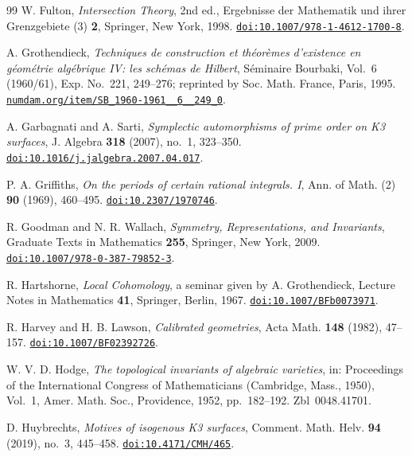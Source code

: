 \documentclass[11pt,reqno]{amsart}
\numberwithin{equation}{section}
\theoremstyle{plain}
\theoremstyle{definition}
\begin{document}
\begin{thebibliography}{99}
W. Fulton,
\emph{Intersection Theory}, 2nd ed.,
Ergebnisse der Mathematik und ihrer Grenzgebiete (3) \textbf{2},
Springer, New York, 1998.
\href{https://doi.org/10.1007/978-1-4612-1700-8}{\nolinkurl{doi:10.1007/978-1-4612-1700-8}}.

A. Grothendieck,
\emph{Techniques de construction et th\'eor\`emes d'existence en g\'eom\'etrie
alg\'ebrique IV: les sch\'emas de Hilbert},
S\'eminaire Bourbaki, Vol.~6 (1960/61), Exp. No.~221, 249--276;
reprinted by Soc. Math. France, Paris, 1995.
\href{http://www.numdam.org/item/SB_1960-1961__6__249_0/}{\nolinkurl{numdam.org/item/SB_1960-1961__6__249_0}}.

A. Garbagnati and A. Sarti,
\emph{Symplectic automorphisms of prime order on K3 surfaces},
J. Algebra \textbf{318} (2007), no.~1, 323--350.
\href{https://doi.org/10.1016/j.jalgebra.2007.04.017}{\nolinkurl{doi:10.1016/j.jalgebra.2007.04.017}}.

P. A. Griffiths,
\emph{On the periods of certain rational integrals. I},
Ann. of Math. (2) \textbf{90} (1969), 460--495.
\href{https://doi.org/10.2307/1970746}{\nolinkurl{doi:10.2307/1970746}}.

R. Goodman and N. R. Wallach,
\emph{Symmetry, Representations, and Invariants},
Graduate Texts in Mathematics \textbf{255}, Springer, New York, 2009.
\href{https://doi.org/10.1007/978-0-387-79852-3}{\nolinkurl{doi:10.1007/978-0-387-79852-3}}.

R. Hartshorne,
\emph{Local Cohomology}, a seminar given by A. Grothendieck,
Lecture Notes in Mathematics \textbf{41}, Springer, Berlin, 1967.
\href{https://doi.org/10.1007/BFb0073971}{\nolinkurl{doi:10.1007/BFb0073971}}.

R. Harvey and H. B. Lawson,
\emph{Calibrated geometries},
Acta Math. \textbf{148} (1982), 47--157.
\href{https://doi.org/10.1007/BF02392726}{\nolinkurl{doi:10.1007/BF02392726}}.

W. V. D. Hodge,
\emph{The topological invariants of algebraic varieties},
in: Proceedings of the International Congress of Mathematicians (Cambridge, Mass., 1950), Vol.~1,
Amer. Math. Soc., Providence, 1952, pp.~182--192. Zbl~0048.41701.

D. Huybrechts,
\emph{Motives of isogenous K3 surfaces},
Comment. Math. Helv. \textbf{94} (2019), no.~3, 445--458.
\href{https://doi.org/10.4171/CMH/465}{\nolinkurl{doi:10.4171/CMH/465}}.


\end{thebibliography}
\end{document}
